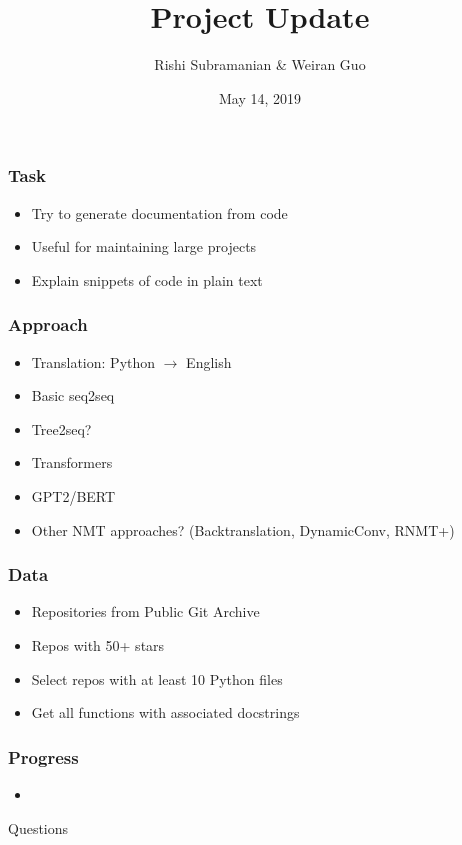 \documentclass{beamer}
\begin{document}
\title{Project Update}
\author{Rishi Subramanian \& Weiran Guo}
\date{May 14, 2019}

\begin{frame}
  \titlepage
\end{frame}

\begin{frame}
  \frametitle{Task}
  \begin{itemize}
  \item Try to generate documentation from code
  \item Useful for maintaining large projects
  \item Explain snippets of code in plain text
  \end{itemize}
\end{frame}

\begin{frame}
  \frametitle{Approach}
  \begin{itemize}
  \item Translation: Python $\to$ English
  \item Basic seq2seq
  \item Tree2seq?
  \item Transformers
  \item GPT2/BERT
  \item Other NMT approaches? (Backtranslation, DynamicConv, RNMT+)
  \end{itemize}
\end{frame}

\begin{frame}
  \frametitle{Data}
  \begin{itemize}
  \item Repositories from Public Git Archive
  \item Repos with 50+ stars
  \item Select repos with at least 10 Python files
  \item Get all functions with associated docstrings
  \end{itemize}
\end{frame}

\begin{frame}
  \frametitle{Progress}
  \begin{itemize}
  \item 
  \end{itemize}
\end{frame}

\begin{frame}[plain,c]
  \begin{center}
    \Huge{Questions}
  \end{center}
  
\end{frame}
\end{document}
